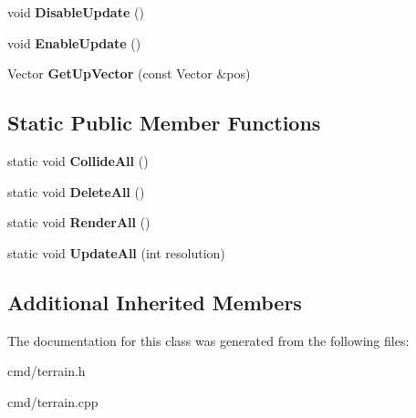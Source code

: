\begin{DoxyCompactItemize}
\item 
void {\bfseries Disable\+Update} ()\hypertarget{classTerrain_a7678baa978f8e55f7c2363c47fab03d1}{}\label{classTerrain_a7678baa978f8e55f7c2363c47fab03d1}

\item 
void {\bfseries Enable\+Update} ()\hypertarget{classTerrain_a5c8aa7249f6ff9d8a02d68fed16bf5da}{}\label{classTerrain_a5c8aa7249f6ff9d8a02d68fed16bf5da}

\item 
Vector {\bfseries Get\+Up\+Vector} (const Vector \&pos)\hypertarget{classTerrain_aec2dedb685103aa7de2b622e5aaec9c4}{}\label{classTerrain_aec2dedb685103aa7de2b622e5aaec9c4}

\end{DoxyCompactItemize}
\subsection*{Static Public Member Functions}
\begin{DoxyCompactItemize}
\item 
static void {\bfseries Collide\+All} ()\hypertarget{classTerrain_ae96794f5a9f9b8825f2c52eea8aca179}{}\label{classTerrain_ae96794f5a9f9b8825f2c52eea8aca179}

\item 
static void {\bfseries Delete\+All} ()\hypertarget{classTerrain_a9f530fa33cb22ed19ece87268ce0130c}{}\label{classTerrain_a9f530fa33cb22ed19ece87268ce0130c}

\item 
static void {\bfseries Render\+All} ()\hypertarget{classTerrain_a8ff07591e54a2b098db9ac49026b4195}{}\label{classTerrain_a8ff07591e54a2b098db9ac49026b4195}

\item 
static void {\bfseries Update\+All} (int resolution)\hypertarget{classTerrain_af10f1018d6e90add19fd2d913e513146}{}\label{classTerrain_af10f1018d6e90add19fd2d913e513146}

\end{DoxyCompactItemize}
\subsection*{Additional Inherited Members}


The documentation for this class was generated from the following files\+:\begin{DoxyCompactItemize}
\item 
cmd/terrain.\+h\item 
cmd/terrain.\+cpp\end{DoxyCompactItemize}
